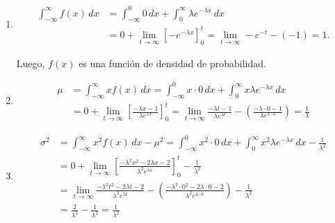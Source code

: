 \documentclass[
  spanish,
  a4paper,
]{scrreport}
\theoremstyle{definition}
\theoremstyle{remark}
\begin{document}
\begin{tcolorbox}[enhanced jigsaw, arc=.35mm, bottomrule=.15mm, bottomtitle=1mm, breakable, colback=white, colbacktitle=quarto-callout-tip-color!10!white, colframe=quarto-callout-tip-color-frame, coltitle=black, left=2mm, leftrule=.75mm, opacityback=0, opacitybacktitle=0.6, rightrule=.15mm, title=\textcolor{quarto-callout-tip-color}{\faLightbulb}\hspace{0.5em}{Solución}, titlerule=0mm, toprule=.15mm, toptitle=1mm]

\begin{enumerate}
\def\labelenumi{\alph{enumi}.}
\item
  \begin{align*}
   \int_{-\infty}^\infty f(x)\,dx 
   &= \int_{-\infty}^0 0\,dx + \int_0^\infty \lambda e^{-\lambda x}\,dx\\
   &= 0 + \lim_{t\to\infty}[-e^{-\lambda x} ]_0^t 
   = \lim_{t\to\infty}-e^{-t}-(-1) = 1. 
   \end{align*}

  Luego, \(f(x)\) es una función de densidad de probabilidad.
\item
  \begin{align*}
   \mu 
   &= \int_{-\infty}^\infty xf(x)\,dx 
   = \int_{-\infty}^0 x\cdot 0\,dx + \int_0^\infty x\lambda e^{-\lambda x}\,dx\\
   &= 0 + \lim_{t\to\infty}\left[\frac{-\lambda x-1}{\lambda e^{\lambda x}}\right]_0^t 
   = \lim_{t\to\infty}\frac{-\lambda t-1}{\lambda e^{\lambda t}}- (\frac{-\lambda\cdot 0-1}{\lambda e^{\lambda \cdot 0}})
   = \frac{1}{\lambda} 
   \end{align*}
\item
  \begin{align*}
   \sigma^2 
   &= \int_{-\infty}^\infty x^2f(x)\,dx -\mu^2
   = \int_{-\infty}^0 x^2\cdot 0\,dx + \int_0^\infty x^2\lambda e^{-\lambda x}\,dx - \frac{1}{\lambda^2}\\
    &= 0 + \lim_{t\to\infty}\left[\frac{-\lambda^2 x^2-2\lambda x-2}{\lambda^2 e^{\lambda x}}\right]_0^t -\frac{1}{\lambda^2} \\
   &= \lim_{t\to\infty}\frac{-\lambda^2 t^2-2\lambda t-2}{\lambda^2 e^{\lambda t}}- \left(\frac{-\lambda^2\cdot 0^2-2\lambda\cdot 0-2}{\lambda^2 e^{\lambda \cdot 0}}\right) -\frac{1}{\lambda^2} \\
   &= \frac{2}{\lambda^2} -\frac{1}{\lambda^2}
   = \frac{1}{\lambda^2}
   \end{align*}
\end{enumerate}

\end{tcolorbox}
\end{document}
